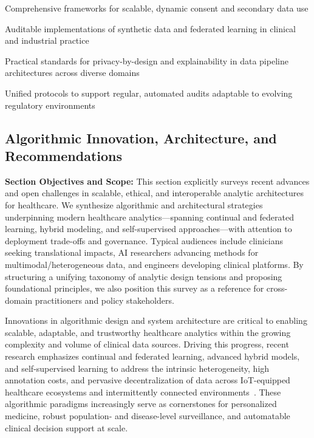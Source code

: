 \documentclass[sigconf]{acmart}
\begin{document}
Comprehensive frameworks for scalable, dynamic consent and secondary data use

Auditable implementations of synthetic data and federated learning in clinical and industrial practice

Practical standards for privacy-by-design and explainability in data pipeline architectures across diverse domains

Unified protocols to support regular, automated audits adaptable to evolving regulatory environments

\subsection{Algorithmic Innovation, Architecture, and Recommendations}

\textbf{Section Objectives and Scope:} This section explicitly surveys recent advances and open challenges in scalable, ethical, and interoperable analytic architectures for healthcare. We synthesize algorithmic and architectural strategies underpinning modern healthcare analytics---spanning continual and federated learning, hybrid modeling, and self-supervised approaches---with attention to deployment trade-offs and governance. Typical audiences include clinicians seeking translational impacts, AI researchers advancing methods for multimodal/heterogeneous data, and engineers developing clinical platforms. By structuring a unifying taxonomy of analytic design tensions and proposing foundational principles, we also position this survey as a reference for cross-domain practitioners and policy stakeholders.

Innovations in algorithmic design and system architecture are critical to enabling scalable, adaptable, and trustworthy healthcare analytics within the growing complexity and volume of clinical data sources. Driving this progress, recent research emphasizes continual and federated learning, advanced hybrid models, and self-supervised learning to address the intrinsic heterogeneity, high annotation costs, and pervasive decentralization of data across IoT-equipped healthcare ecosystems and intermittently connected environments~\cite{ref36, ref37, ref42, ref43, ref46, ref50, ref54, ref61, ref65, ref70, ref71, ref72, ref74, ref75, ref76, ref77, ref78, ref79, ref90, ref104, ref105, ref107}. These algorithmic paradigms increasingly serve as cornerstones for personalized medicine, robust population- and disease-level surveillance, and automatable clinical decision support at scale.
\end{document}
